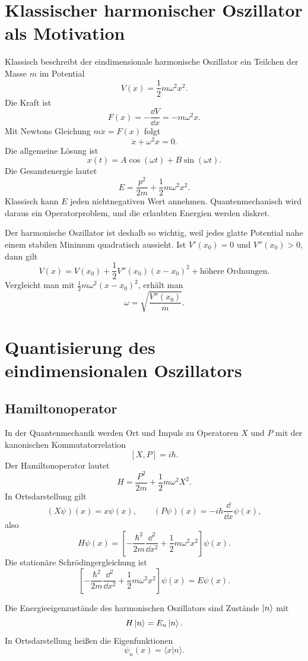 \section{Klassischer harmonischer Oszillator als Motivation}

Klassisch beschreibt der eindimensionale harmonische Oszillator ein Teilchen der Masse $m$ im Potential
\[
    V(x)=\frac12 m\omega^2x^2.
\]
Die Kraft ist
\[
    F(x)=-\frac{\dd V}{\dd x}=-m\omega^2x.
\]
Mit Newtons Gleichung $m\ddot x=F(x)$ folgt
\[
    \ddot x+\omega^2x=0.
\]
Die allgemeine Lösung ist
\[
    x(t)=A\cos(\omega t)+B\sin(\omega t).
\]
Die Gesamtenergie lautet
\[
    E=\frac{p^2}{2m}+\frac12m\omega^2x^2.
\]
Klassisch kann $E$ jeden nichtnegativen Wert annehmen. Quantenmechanisch wird daraus ein Operatorproblem, und die erlaubten Energien werden diskret.

\begin{notebox}
Der harmonische Oszillator ist deshalb so wichtig, weil jedes glatte Potential nahe einem stabilen Minimum quadratisch aussieht. Ist $V'(x_0)=0$ und $V''(x_0)>0$, dann gilt
\[
    V(x)=V(x_0)+\frac12V''(x_0)(x-x_0)^2+\text{höhere Ordnungen}.
\]
Vergleicht man mit $\frac12m\omega^2(x-x_0)^2$, erhält man
\[
    \omega=\sqrt{\frac{V''(x_0)}{m}}.
\]
\end{notebox}

\section{Quantisierung des eindimensionalen Oszillators}

\subsection{Hamiltonoperator}

In der Quantenmechanik werden Ort und Impuls zu Operatoren $X$ und $P$ mit der kanonischen Kommutatorrelation
\[
    [X,P]=i\hbar.
\]
Der Hamiltonoperator lautet
\[
    H=\frac{P^2}{2m}+\frac12m\omega^2X^2.
\]
In Ortsdarstellung gilt
\[
    (X\psi)(x)=x\psi(x),\qquad (P\psi)(x)=-i\hbar\frac{\dd}{\dd x}\psi(x),
\]
also
\[
    H\psi(x)=\left[-\frac{\hbar^2}{2m}\frac{\dd^2}{\dd x^2}+\frac12m\omega^2x^2\right]\psi(x).
\]
Die stationäre Schrödingergleichung ist
\[
    \left[-\frac{\hbar^2}{2m}\frac{\dd^2}{\dd x^2}+\frac12m\omega^2x^2\right]\psi(x)=E\psi(x).
\]

\begin{definitionbox}
Die Energieeigenzustände des harmonischen Oszillators sind Zustände $\left|n\right\rangle$ mit
\[
    H\left|n\right\rangle=E_n\left|n\right\rangle.
\]
In Ortsdarstellung heißen die Eigenfunktionen
\[
    \psi_n(x)=\langle x|n\rangle.
\]
\end{definitionbox}

